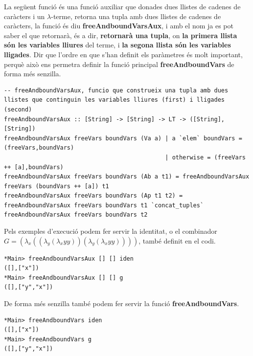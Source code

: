 \documentclass[10pt,a4paper]{article}
\begin{document}
La següent funció és una funció auxiliar que donades dues llistes de cadenes de caràcters i un $\lambda$-terme, retorna una tupla amb dues llistes de cadenes de caràcters, la funció és diu \textbf{freeAndboundVarsAux}, i amb el nom ja es pot saber el que retornarà, és a dir, \textbf{retornarà una tupla}, on \textbf{la primera llista són les variables lliures} del terme, i \textbf{la segona llista són les variables lligades}. Dir que l'ordre en que s'han definit els paràmetres és molt important, perquè això ens permetra definir la funció principal \textbf{freeAndboundVars} de forma més senzilla.

\lstset{language=Haskell, breaklines=true, basicstyle=\footnotesize}
\begin{lstlisting}[frame=mystyle]
-- freeAndboundVarsAux, funcio que construeix una tupla amb dues llistes que continguin les variables lliures (first) i lligades (second)
freeAndboundVarsAux :: [String] -> [String] -> LT -> ([String],[String])
freeAndboundVarsAux freeVars boundVars (Va a) | a `elem` boundVars = (freeVars,boundVars)
                                              | otherwise = (freeVars ++ [a],boundVars)
freeAndboundVarsAux freeVars boundVars (Ab a t1) = freeAndboundVarsAux freeVars (boundVars ++ [a]) t1
freeAndboundVarsAux freeVars boundVars (Ap t1 t2) = freeAndboundVarsAux freeVars boundVars t1 `concat_tuples` freeAndboundVarsAux freeVars boundVars t2
\end{lstlisting}

\clearpage

Pels exemples d'execució podem fer servir la identitat, o el combinador $G = (\lambda_x ((\lambda_y (\lambda_x  y y)) (\lambda_y (\lambda_x  y y))))$, també definit en el codi.

\lstset{language=Haskell, breaklines=true, basicstyle=\footnotesize}
\begin{lstlisting}[frame=mystyle]
*Main> freeAndboundVarsAux [] [] iden
([],["x"])
*Main> freeAndboundVarsAux [] [] g
([],["y","x"])
\end{lstlisting}

De forma més senzilla també podem fer servir la funció \textbf{freeAndboundVars}.

\lstset{language=Haskell, breaklines=true, basicstyle=\footnotesize}
\begin{lstlisting}[frame=mystyle]
*Main> freeAndboundVars iden
([],["x"])
*Main> freeAndboundVars g
([],["y","x"])
\end{lstlisting}
\end{document}
